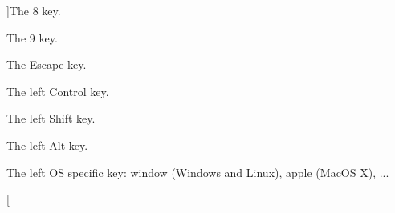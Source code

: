 \begin{Desc}
\begin{description}
{}]The 8 key. \item[{\em 
\hypertarget{classsf_1_1_keyboard_acb4cacd7cc5802dec45724cf3314a142aea295658de02326acf1a9db235b1ba95}{Num9}\label{classsf_1_1_keyboard_acb4cacd7cc5802dec45724cf3314a142aea295658de02326acf1a9db235b1ba95}
}]The 9 key. \item[{\em 
\hypertarget{classsf_1_1_keyboard_acb4cacd7cc5802dec45724cf3314a142a72019ff9ecb145a9d3910177a49c757a}{Escape}\label{classsf_1_1_keyboard_acb4cacd7cc5802dec45724cf3314a142a72019ff9ecb145a9d3910177a49c757a}
}]The Escape key. \item[{\em 
\hypertarget{classsf_1_1_keyboard_acb4cacd7cc5802dec45724cf3314a142adf00bbce0e3c42a84ba8263458eb1360}{L\-Control}\label{classsf_1_1_keyboard_acb4cacd7cc5802dec45724cf3314a142adf00bbce0e3c42a84ba8263458eb1360}
}]The left Control key. \item[{\em 
\hypertarget{classsf_1_1_keyboard_acb4cacd7cc5802dec45724cf3314a142a8d907db68964d5a235f80567b6d3d354}{L\-Shift}\label{classsf_1_1_keyboard_acb4cacd7cc5802dec45724cf3314a142a8d907db68964d5a235f80567b6d3d354}
}]The left Shift key. \item[{\em 
\hypertarget{classsf_1_1_keyboard_acb4cacd7cc5802dec45724cf3314a142aa450e78db56ad7a9cfbca7e4c8f2d252}{L\-Alt}\label{classsf_1_1_keyboard_acb4cacd7cc5802dec45724cf3314a142aa450e78db56ad7a9cfbca7e4c8f2d252}
}]The left Alt key. \item[{\em 
\hypertarget{classsf_1_1_keyboard_acb4cacd7cc5802dec45724cf3314a142ac332c415bb423b14012b51a6f8433538}{L\-System}\label{classsf_1_1_keyboard_acb4cacd7cc5802dec45724cf3314a142ac332c415bb423b14012b51a6f8433538}
}]The left O\-S specific key\-: window (Windows and Linux), apple (Mac\-O\-S X), ... \item[{\em 
}
\end{description}
\end{Desc}
